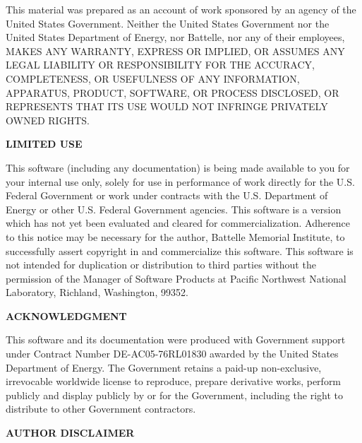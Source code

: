 %
%

This material was prepared as an account of work sponsored by an agency of the
United States Government.  Neither the United States Government nor the United
States Department of Energy, nor Battelle, nor any of their employees, MAKES
ANY WARRANTY, EXPRESS OR IMPLIED, OR ASSUMES ANY LEGAL LIABILITY OR
RESPONSIBILITY FOR THE ACCURACY, COMPLETENESS, OR USEFULNESS OF ANY
INFORMATION, APPARATUS, PRODUCT, SOFTWARE, OR PROCESS DISCLOSED, OR REPRESENTS
THAT ITS USE WOULD NOT INFRINGE PRIVATELY OWNED RIGHTS.


\begin{center}
{\bf LIMITED USE}
\end{center}

This software (including any documentation) is being made available to
you for your internal use only, solely for use in performance of work
directly for the U.S. Federal Government or work under contracts with
the U.S. Department of Energy or other U.S. Federal Government
agencies.  This software is a version which has not yet been evaluated
and cleared for commercialization.  Adherence to this notice may be
necessary for the author, Battelle Memorial Institute, to successfully
assert copyright in and commercialize this software.  This software is
not intended for duplication or distribution to third parties without
the permission of the Manager of Software Products at Pacific
Northwest National Laboratory, Richland, Washington, 99352.

\begin{center}
{\bf ACKNOWLEDGMENT}
\end{center}

This software and its documentation were produced with Government support under
Contract Number DE-AC05-76RL01830 awarded by the United States Department of
Energy.  The Government retains a paid-up non-exclusive, irrevocable worldwide
license to reproduce, prepare derivative works, perform publicly and display
publicly by or for the Government, including the right to distribute to other
Government contractors.


\clearpage

\begin{center}
{\bf AUTHOR DISCLAIMER}
\end{center}

